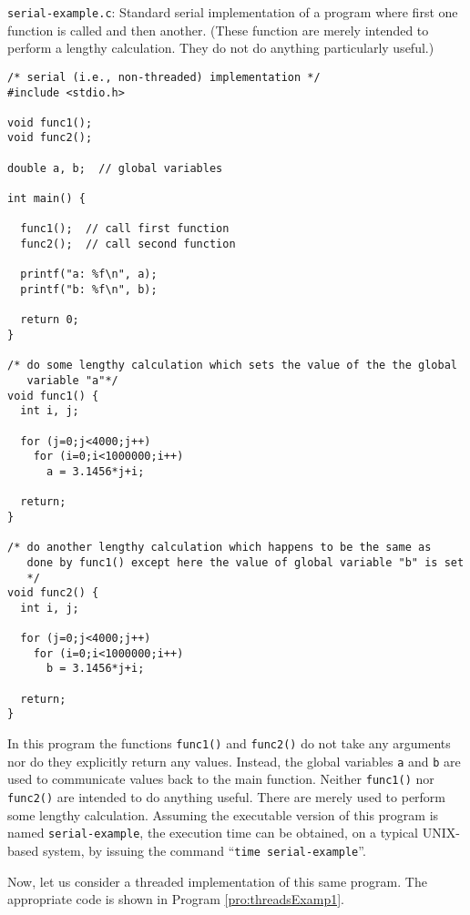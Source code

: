 \begin{program}
{\tt serial-example.c}: Standard serial implementation of a program
where first one function is called and then another.  (These function
are merely intended to perform a lengthy calculation.  They do not do
anything particularly useful.) \label{pro:serialExamp}
\codemiddle
\begin{lstlisting}
/* serial (i.e., non-threaded) implementation */
#include <stdio.h>

void func1();
void func2();

double a, b;  // global variables

int main() {

  func1();  // call first function
  func2();  // call second function

  printf("a: %f\n", a);
  printf("b: %f\n", b);

  return 0;
}

/* do some lengthy calculation which sets the value of the the global
   variable "a"*/
void func1() {
  int i, j;

  for (j=0;j<4000;j++)
    for (i=0;i<1000000;i++)
      a = 3.1456*j+i;

  return;
}
  
/* do another lengthy calculation which happens to be the same as
   done by func1() except here the value of global variable "b" is set
   */
void func2() {
  int i, j;

  for (j=0;j<4000;j++)
    for (i=0;i<1000000;i++)
      b = 3.1456*j+i;

  return;
}
\end{lstlisting}
\end{program}

In this program the functions {\tt func1()} and {\tt func2()} do not
take any arguments nor do they explicitly return any values.  Instead,
the global variables {\tt a} and {\tt b} are used to communicate
values back to the main function.  Neither {\tt func1()} nor {\tt
func2()} are intended to do anything useful.  There are merely used to
perform some lengthy calculation.  Assuming the executable version of
this program is named {\tt serial-example}, the execution time can
be obtained, on a typical UNIX-based system, by issuing the command
``{\tt time serial-example}''.

Now, let us consider a threaded implementation of this same program.
The appropriate code is shown in Program \ref{pro:threadsExamp1}.

